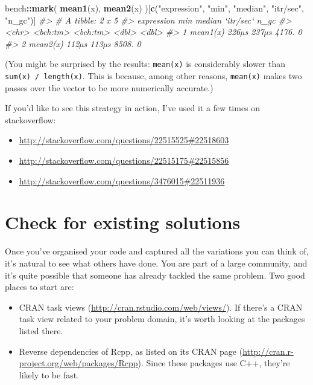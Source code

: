 \documentclass[]{book}
\newenvironment{Shaded}{\begin{snugshade}}{\end{snugshade}}
\newcommand{\CommentTok}[1]{\textcolor[rgb]{0.37,0.37,0.37}{\textit{#1}}}
\newcommand{\KeywordTok}[1]{\textcolor[rgb]{0.27,0.27,0.27}{\textbf{#1}}}
\newcommand{\NormalTok}[1]{#1}
\newcommand{\OperatorTok}[1]{\textcolor[rgb]{0.43,0.43,0.43}{\textbf{#1}}}
\newcommand{\StringTok}[1]{\textcolor[rgb]{0.5,0.5,0.5}{#1}}
\providecommand{\tightlist}{%
  \setlength{\itemsep}{0pt}\setlength{\parskip}{0pt}}
\renewcommand{\href}[2]{#2 (\url{#1})}
\begin{document}
\begin{Shaded}
\begin{Highlighting}[]
\NormalTok{bench}\OperatorTok{::}\KeywordTok{mark}\NormalTok{(}
  \KeywordTok{mean1}\NormalTok{(x),}
  \KeywordTok{mean2}\NormalTok{(x)}
\NormalTok{)[}\KeywordTok{c}\NormalTok{(}\StringTok{"expression"}\NormalTok{, }\StringTok{"min"}\NormalTok{, }\StringTok{"median"}\NormalTok{, }\StringTok{"itr/sec"}\NormalTok{, }\StringTok{"n_gc"}\NormalTok{)]}
\CommentTok{#> # A tibble: 2 x 5}
\CommentTok{#>   expression      min   median `itr/sec`  n_gc}
\CommentTok{#>   <chr>      <bch:tm> <bch:tm>     <dbl> <dbl>}
\CommentTok{#> 1 mean1(x)      226µs    237µs     4176.     0}
\CommentTok{#> 2 mean2(x)      112µs    113µs     8508.     0}
\end{Highlighting}
\end{Shaded}

(You might be surprised by the results: \texttt{mean(x)} is considerably slower than \texttt{sum(x)\ /\ length(x)}. This is because, among other reasons, \texttt{mean(x)} makes two passes over the vector to be more numerically accurate.)

If you'd like to see this strategy in action, I've used it a few times on stackoverflow:

\begin{itemize}
\tightlist
\item
  \url{http://stackoverflow.com/questions/22515525\#22518603}
\item
  \url{http://stackoverflow.com/questions/22515175\#22515856}
\item
  \url{http://stackoverflow.com/questions/3476015\#22511936}
\end{itemize}

\hypertarget{already-solved}{%
\section{Check for existing solutions}\label{already-solved}}

Once you've organised your code and captured all the variations you can think of, it's natural to see what others have done. You are part of a large community, and it's quite possible that someone has already tackled the same problem. Two good places to start are:

\begin{itemize}
\item
  \href{http://cran.rstudio.com/web/views/}{CRAN task views}. If there's a
  CRAN task view related to your problem domain, it's worth looking at
  the packages listed there.
\item
  Reverse dependencies of Rcpp, as listed on its
  \href{http://cran.r-project.org/web/packages/Rcpp}{CRAN page}. Since these
  packages use C++, they're likely to be fast.
\end{itemize}
\end{document}
